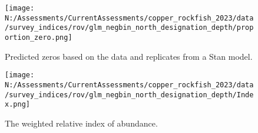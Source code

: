 \documentclass[11pt,
  english,
  letterpaper,
]{article}
\begin{document}
\newpage

\begin{figure}
\centering
\texttt{[image: N:/Assessments/CurrentAssessments/copper\_rockfish\_2023/data/survey\_indices/rov/glm\_negbin\_north\_designation\_depth/proportion\_zero.png]}
\caption{Predicted zeros based on the data and replicates from a Stan model.\label{fig:rov-prop-zero}}
\end{figure}

\newpage

\begin{figure}
\centering
\texttt{[image: N:/Assessments/CurrentAssessments/copper\_rockfish\_2023/data/survey\_indices/rov/glm\_negbin\_north\_designation\_depth/Index.png]}
\caption{The weighted relative index of abundance.\label{fig:rov-index}}
\end{figure}
\end{document}
